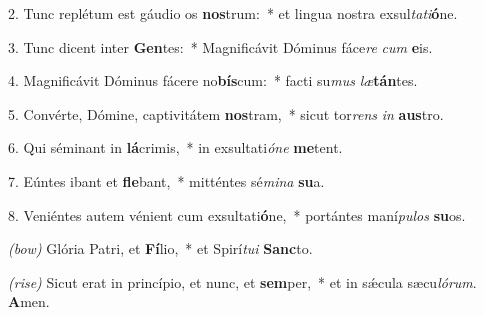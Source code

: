 2. Tunc replétum est gáudio os \textbf{nos}trum:~* et lingua nostra exsul\textit{ta}\textit{ti}\textbf{ó}ne.

3. Tunc dicent inter \textbf{Gen}tes:~* Magnificávit Dóminus fáce\textit{re} \textit{cum} \textbf{e}is.

4. Magnificávit Dóminus fácere no\textbf{bís}cum:~* facti su\textit{mus} \textit{læ}\textbf{tán}tes.

5. Convérte, Dómine, captivitátem \textbf{nos}tram,~* sicut tor\textit{rens} \textit{in} \textbf{aus}tro.

6. Qui séminant in \textbf{lá}crimis,~* in exsultati\textit{ó}\textit{ne} \textbf{me}tent.

7. Eúntes ibant et \textbf{fle}bant,~* mitténtes sé\textit{mi}\textit{na} \textbf{su}a.

8. Veniéntes autem vénient cum exsultati\textbf{ó}ne,~* portántes maní\textit{pu}\textit{los} \textbf{su}os.

\textit{(bow)} Glória Patri, et \textbf{Fí}lio,~* et Spirí\textit{tu}\textit{i} \textbf{Sanc}to.

\textit{(rise)}  Sicut erat in princípio, et nunc, et \textbf{sem}per,~* et in s\'{\ae}cula sæcu\textit{ló}\textit{rum}. \textbf{A}men.